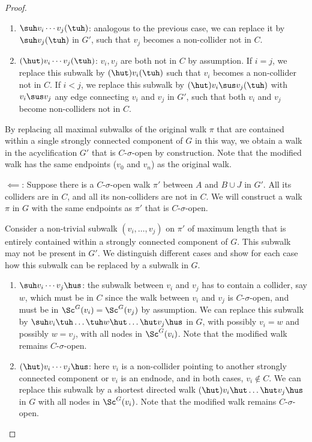 \begin{proof}
\begin{enumerate}[label=(\roman*)]
\item
$\suh v_i \cdots v_j (\tuh)$: analogous to the previous case, we can replace it by $\suh v_j (\tuh)$ in $G'$,
such that $v_j$ becomes a non-collider not in $C$.

\item
$(\hut) v_i \cdots v_j (\tuh)$: 
$v_i,v_j$ are both not in $C$ by assumption. If $i = j$, we replace this subwalk by $(\hut) v_i (\tuh)$ 
such that $v_i$ becomes a non-collider not in $C$. If $i < j$, we replace this subwalk by
$(\hut) v_i \sus v_j (\tuh)$ with $v_i \sus v_j$ any edge connecting $v_i$ and $v_j$ in $G'$,
such that both $v_i$ and $v_j$ become non-colliders not in $C$.
\end{enumerate}
By replacing all maximal subwalks of the original walk $\pi$ that are contained within a single strongly connected
component of $G$ in this way, we obtain a walk in the acyclification $G'$ that is $C$-$\sigma$-open by construction.
Note that the modified walk has the same endpoints ($v_0$ and $v_n$) as the original walk.

$\impliedby$: Suppose there is a $C$-$\sigma$-open walk $\pi'$ between $A$ and $B \cup J$ in $G'$.
All its colliders are in $C$, and all its non-colliders are not in $C$. 
We will construct a walk $\pi$ in $G$ with the same endpoints as $\pi'$ that is $C$-$\sigma$-open.

Consider a non-trivial subwalk $(v_i,\dots,v_j)$ on $\pi'$ of maximum length that is entirely contained within a strongly connected component of $G$. 
This subwalk may not be present in $G'$.
We distinguish different cases and show for each case how this subwalk can be replaced by a subwalk in $G$.
\begin{enumerate}[label=(\roman*)]
  \item 
$\suh v_i \cdots v_j \hus$: the subwalk between $v_i$ and $v_j$ has to contain a collider, say $w$,
which must be in $C$ since the walk between $v_i$ and $v_j$ is $C$-$\sigma$-open, and must be in
$\Sc^G(v_i) = \Sc^G(v_j)$ by assumption. We can replace this subwalk by
$\suh v_i \tuh \dots \tuh w \hut \dots \hut v_j \hus$ in $G$,
with possibly $v_i = w$ and possibly $w = v_j$, 
with all nodes in $\Sc^G(v_i)$. 
Note that the modified walk remains $C$-$\sigma$-open.

\item
$(\hut) v_i \cdots v_j \hus$:
here $v_i$ is a non-collider pointing to another strongly connected component or $v_i$ is an endnode,
and in both cases, $v_i \notin C$. 
We can replace this subwalk by a shortest directed walk
$(\hut) v_i \hut \dots \hut v_j \hus$ in $G$ with all nodes in $\Sc^G(v_i)$.
Note that the modified walk remains $C$-$\sigma$-open.


\end{enumerate}
\end{proof}
